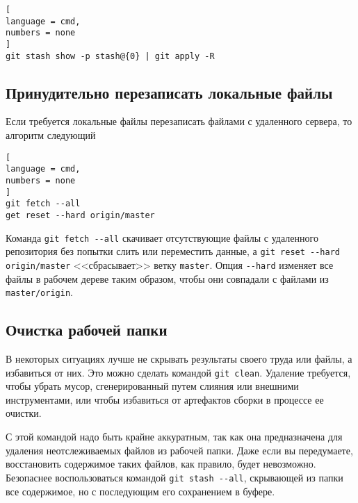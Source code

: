 \documentclass[%
	11pt,
	a4paper,
	utf8,
		]{article}
\begin{document}
\begin{lstlisting}[
language = cmd,
numbers = none
]
git stash show -p stash@{0} | git apply -R
\end{lstlisting}




\subsection{Принудительно перезаписать локальные файлы}

Если требуется локальные файлы перезаписать файлами с удаленного сервера, то алгоритм следующий

\begin{lstlisting}[
language = cmd,
numbers = none
]
git fetch --all
get reset --hard origin/master
\end{lstlisting}

Команда \lstinline{git fetch --all} скачивает отсутствующие файлы с удаленного репозитория без попытки слить или переместить данные, а \lstinline{git reset --hard origin/master} <<сбрасывает>> ветку \texttt{master}. Опция \lstinline{--hard} изменяет все файлы в рабочем дереве таким образом, чтобы они совпадали с файлами из \texttt{master/origin}.

\subsection{Очистка рабочей папки}

В некоторых ситуациях лучше не скрывать результаты своего труда или файлы, а избавиться от них. Это можно сделать командой \texttt{git clean}. Удаление требуется, чтобы убрать мусор, сгенерированный путем слияния или внешними инструментами, или чтобы избавиться от артефактов сборки в процессе ее очистки.

С этой командой надо быть крайне аккуратным, так как она предназначена для удаления неотслеживаемых файлов из рабочей папки. Даже если вы передумаете, восстановить содержимое таких файлов, как правило, будет невозможно. Безопаснее воспользоваться командой \lstinline{git stash --all}, скрывающей из папки все содержимое, но с последующим его сохранением в буфере.
\end{document}
